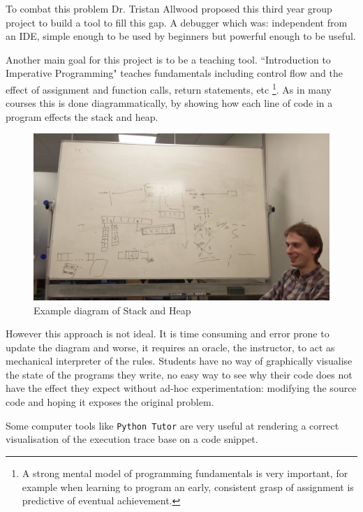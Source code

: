 \documentclass[11pt, a4paper]{article}
\newcommand{\cmd}[1]{{\tt #1}}
\begin{document}
To combat this problem Dr. Tristan Allwood proposed\cite{projectproposal} this third year group project to build a tool to fill this gap.
A debugger which was: independent from an IDE, simple enough to be used by beginners but powerful enough to be useful.

Another main goal for this project is to be a teaching tool.
``Introduction to Imperative Programming" teaches fundamentals including control flow and the effect of assignment and function calls, return statements, etc
\footnote{A strong mental model of programming fundamentals is very important, for example when learning to program an early, consistent grasp of assignment is predictive of eventual achievement\cite{saeed09}.}.
As in many courses this is done diagrammatically, by showing how each line of code in a program effects the stack and heap.

\begin{figure}[h!]
\centering
\includegraphics[width=125mm]{whiteBoardDrawing.jpg}
\caption{Example diagram of Stack and Heap}
\label{boarddiagrams}
\end{figure}

However this approach is not ideal.
It is time consuming and error prone to update the diagram and worse, it requires an oracle, the instructor, to act as mechanical interpreter of the rules.
Students have no way of graphically visualise the state of the programs they write, no easy way to see why their code does not have the effect they expect without ad-hoc experimentation: modifying the source code and hoping it exposes the original problem.

Some computer tools like \cmd{Python Tutor} \cite{pythontutor} are very useful at rendering a correct visualisation of the execution trace base on a code snippet.
\end{document}
